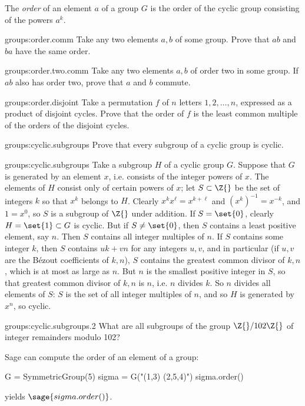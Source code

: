 The \emph{order} of an element \(a\) of a group \(G\) is the order of the cyclic group consisting of the powers \(a^k\).
\begin{problem}{groups:order.comm}
Take any two elements \(a,b\) of some group.
Prove that \(ab\) and \(ba\) have the same order.
\end{problem}
\begin{problem}{groups:order.two.comm}
Take any two elements \(a,b\) of order two in some group.
If \(ab\) also has order two, prove that \(a\) and \(b\) commute.
\end{problem}
\begin{problem}{groups:order.disjoint}
Take a permutation \(f\) of \(n\) letters \(1,2,\dots,n\), expressed as a product of disjoint cycles.
Prove that the order of \(f\) is the least common multiple of the orders of the disjoint cycles.
\end{problem}
\begin{problem}{groups:cyclic.subgroups}
Prove that every subgroup of a cyclic group is cyclic.
\end{problem}
\begin{answer}{groups:cyclic.subgroups}
Take a subgroup \(H\) of a cyclic group \(G\).
Suppose that \(G\) is generated by an element \(x\), i.e. consists of the integer powers of \(x\).
The elements of \(H\) consist only of certain powers of \(x\); let \(S \subset \Z{}\) be the set of integers \(k\) so that \(x^k\) belongs to \(H\).
Clearly \(x^kx^{\ell}=x^{k+\ell}\) and \((x^k)^{-1}=x^{-k}\), and \(1=x^0\), so \(S\) is a subgroup of \(\Z{}\) under addition.
If \(S=\set{0}\), clearly \(H=\set{1} \subset G\) is cyclic.
But if \(S\ne\set{0}\), then \(S\) contains a least positive element, say \(n\).
Then \(S\) contains all integer multiples of \(n\).
If \(S\) contains some integer \(k\), then \(S\) contains \(uk+vn\) for any integers \(u,v\), and in particular (if \(u,v\) are the B\'ezout coefficients of \(k,n\)), \(S\) contains the greatest common divisor of \(k,n\), which is at most as large as \(n\).
But \(n\) is the smallest positive integer in \(S\), so that greatest common divisor of \(k,n\) is \(n\), i.e. \(n\) divides \(k\).
So \(n\) divides all elements of \(S\): \(S\) is the set of all integer multiples of \(n\), and so \(H\) is generated by \(x^n\), so cyclic.
\end{answer}
\begin{problem}{groups:cyclic.subgroups.2}
What are all subgroups of the group \(\Z{}/102\Z{}\) of integer remainders modulo 102?
\end{problem}
Sage can compute the order of an element of a group:
\begin{sageblock}
G = SymmetricGroup(5)
sigma = G("(1,3) (2,5,4)")
sigma.order()
\end{sageblock}
yields \(\sage{sigma.order()}\).

